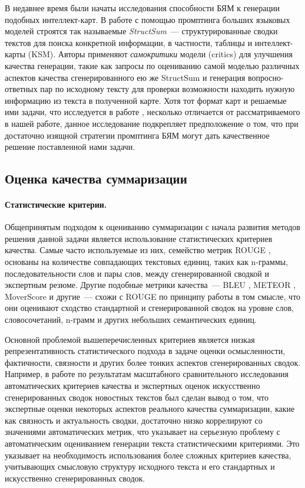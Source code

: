 \documentclass[12pt]{article}
\begin{document}
В недавнее время были начаты исследования способности БЯМ к генерации подобных интеллект-карт. В работе \cite{jain2024structsum} с помощью промптинга больших языковых моделей строятся так называемые \emph{StructSum}~--- структурированные сводки текстов для поиска конкретной информации, в частности, таблицы и интеллект-карты (KSM). Авторы применяют \textit{самокритики} модели (critics) для улучшения качества генерации, такие как запросы по оцениванию самой моделью различных аспектов качества сгенерированного ею же StructSum и генерация вопросно-ответных пар по исходному тексту для проверки возможности находить нужную информацию из текста в полученной карте. Хотя тот формат карт и решаемые ими задачи, что исследуется в работе \cite{jain2024structsum}, несколько отличается от рассматриваемого в нашей работе, данное исследование подкрепляет предположение о том, что при достаточно изящной стратегии промптинга БЯМ могут дать качественное решение поставленной нами задачи.


\subsection{Оценка качества суммаризации}
\paragraph{Статистические критерии.} Общепринятым подходом к оцениванию суммаризации с начала развития методов решения данной задачи является использование статистических критериев качества. Самые часто используемые из них, семейство метрик ROUGE \cite{lin2004rouge}, основаны на количестве совпадающих текстовых единиц, таких как n-граммы, последовательности слов и пары слов, между сгенерированной сводкой и экспертным резюме. Другие подобные метрики качества~--- BLEU \cite{papineni2002bleu}, METEOR \cite{banerjee2005meteor}, MoverScore \cite{zhao2019moverscore} и другие~--- схожи с ROUGE по принципу работы в том смысле, что они оценивают сходство стандартной и сгенерированной сводок на уровне слов, словосочетаний, n-грамм и других небольших семантических единиц. 

Основной проблемой вышеперечисленных критериев является низкая репрезентативность статистического подхода в задаче оценки осмысленности, фактичности, связности и других более тонких аспектов сгенерированных сводок. Например, в работе \cite{fabbri2021summeval} по результатам масштабного сравнительного исследования автоматических критериев качества и экспертных оценок искусственно сгенерированных сводок новостных текстов был сделан вывод о том, что экспертные оценки некоторых аспектов реального качества суммаризации, какие как связность и актуальность сводки, достаточно низко коррелируют со значениями автоматических метрик, что указывает на серьезную проблему с автоматическим оцениванием генерации текста статистическими критериями. Это указывает на необходимость использования более сложных критериев качества, учитывающих смысловую структуру исходного текста и его стандартных и искусственно сгенерированных сводок.
\end{document}
